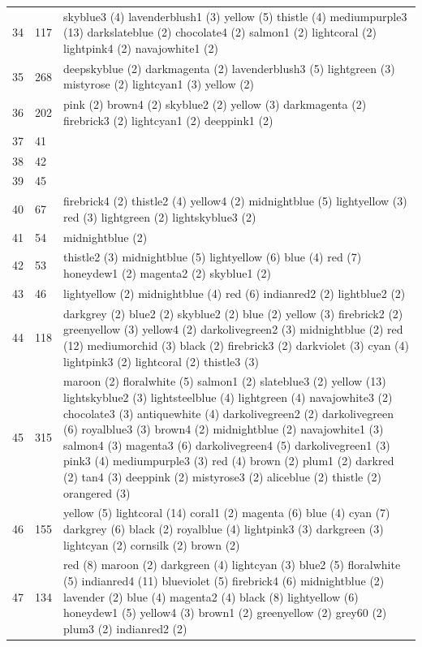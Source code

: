 \begin{landscape}
\begin{longtable}{|p{1.5cm}|p{1.25cm}|p{21cm}|}
34 & 117 & skyblue3 (4) lavenderblush1 (3) yellow (5) thistle (4) mediumpurple3 (13) darkslateblue (2) chocolate4 (2) salmon1 (2) lightcoral (2) lightpink4 (2) navajowhite1 (2) \\
35 & 268 & deepskyblue (2) darkmagenta (2) lavenderblush3 (5) lightgreen (3) mistyrose (2) lightcyan1 (3) yellow (2) \\
36 & 202 & pink (2) brown4 (2) skyblue2 (2) yellow (3) darkmagenta (2) firebrick3 (2) lightcyan1 (2) deeppink1 (2) \\
37 & 41 & \\
38 & 42 & \\
39 & 45 & \\
40 & 67 & firebrick4 (2) thistle2 (4) yellow4 (2) midnightblue (5) lightyellow (3) red (3) lightgreen (2) lightskyblue3 (2) \\
41 & 54 & midnightblue (2) \\
42 & 53 & thistle2 (3) midnightblue (5) lightyellow (6) blue (4) red (7) honeydew1 (2) magenta2 (2) skyblue1 (2) \\
43 & 46 & lightyellow (2) midnightblue (4) red (6) indianred2 (2) lightblue2 (2) \\
44 & 118 & darkgrey (2) blue2 (2) skyblue2 (2) blue (2) yellow (3) firebrick2 (2) greenyellow (3) yellow4 (2) darkolivegreen2 (3) midnightblue (2) red (12) mediumorchid (3) black (2) firebrick3 (2) darkviolet (3) cyan (4) lightpink3 (2) lightcoral (2) thistle3 (3) \\
45 & 315 & maroon (2) floralwhite (5) salmon1 (2) slateblue3 (2) yellow (13) lightskyblue2 (3) lightsteelblue (4) lightgreen (4) navajowhite3 (2) chocolate3 (3) antiquewhite (4) darkolivegreen2 (2) darkolivegreen (6) royalblue3 (3) brown4 (2) midnightblue (2) navajowhite1 (3) salmon4 (3) magenta3 (6) darkolivegreen4 (5) darkolivegreen1 (3) pink3 (4) mediumpurple3 (3) red (4) brown (2) plum1 (2) darkred (2) tan4 (3) deeppink (2) mistyrose3 (2) aliceblue (2) thistle (2) orangered (3) \\
46 & 155 & yellow (5) lightcoral (14) coral1 (2) magenta (6) blue (4) cyan (7) darkgrey (6) black (2) royalblue (4) lightpink3 (3) darkgreen (3) lightcyan (2) cornsilk (2) brown (2) \\
47 & 134 & red (8) maroon (2) darkgreen (4) lightcyan (3) blue2 (5) floralwhite (5) indianred4 (11) blueviolet (5) firebrick4 (6) midnightblue (2) lavender (2) blue (4) magenta2 (4) black (8) lightyellow (6) honeydew1 (5) yellow4 (3) brown1 (2) greenyellow (2) grey60 (2) plum3 (2) indianred2 (2) \\

\end{longtable}
\end{landscape}
